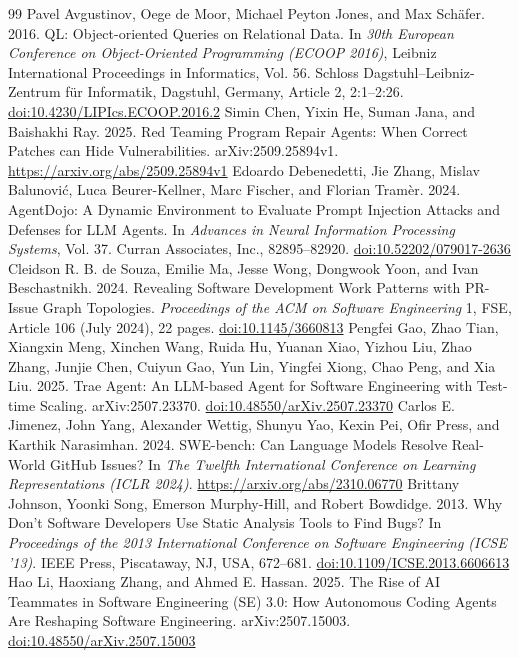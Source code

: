 \documentclass[acmsmall,screen,nonacm]{acmart}
\providecommand{\doi}[1]{\href{https://doi.org/#1}{doi:#1}}
\begin{document}
\clearpage
\raggedbottom
\begingroup
\begin{thebibliography}{99}
\fontsize{8}{9}\selectfont
\setlength{\itemsep}{0pt}
\setlength{\parsep}{0pt}
\setlength{\parskip}{0pt}
 Pavel Avgustinov, Oege de Moor, Michael Peyton Jones, and Max Sch\"afer. 2016. QL: Object-oriented Queries on Relational Data. In \emph{30th European Conference on Object-Oriented Programming (ECOOP 2016)}, Leibniz International Proceedings in Informatics, Vol. 56. Schloss Dagstuhl--Leibniz-Zentrum f\"ur Informatik, Dagstuhl, Germany, Article 2, 2:1--2:26. \doi{10.4230/LIPIcs.ECOOP.2016.2}
 Simin Chen, Yixin He, Suman Jana, and Baishakhi Ray. 2025. Red Teaming Program Repair Agents: When Correct Patches can Hide Vulnerabilities. arXiv:2509.25894v1. \url{https://arxiv.org/abs/2509.25894v1}
 Edoardo Debenedetti, Jie Zhang, Mislav Balunovi\'c, Luca Beurer-Kellner, Marc Fischer, and Florian Tram\`er. 2024. AgentDojo: A Dynamic Environment to Evaluate Prompt Injection Attacks and Defenses for LLM Agents. In \emph{Advances in Neural Information Processing Systems}, Vol. 37. Curran Associates, Inc., 82895--82920. \doi{10.52202/079017-2636}
 Cleidson R. B. de Souza, Emilie Ma, Jesse Wong, Dongwook Yoon, and Ivan Beschastnikh. 2024. Revealing Software Development Work Patterns with PR-Issue Graph Topologies. \emph{Proceedings of the ACM on Software Engineering} 1, FSE, Article 106 (July 2024), 22 pages. \doi{10.1145/3660813}
 Pengfei Gao, Zhao Tian, Xiangxin Meng, Xinchen Wang, Ruida Hu, Yuanan Xiao, Yizhou Liu, Zhao Zhang, Junjie Chen, Cuiyun Gao, Yun Lin, Yingfei Xiong, Chao Peng, and Xia Liu. 2025. Trae Agent: An LLM-based Agent for Software Engineering with Test-time Scaling. arXiv:2507.23370. \doi{10.48550/arXiv.2507.23370}
 Carlos E. Jimenez, John Yang, Alexander Wettig, Shunyu Yao, Kexin Pei, Ofir Press, and Karthik Narasimhan. 2024. SWE-bench: Can Language Models Resolve Real-World GitHub Issues? In \emph{The Twelfth International Conference on Learning Representations (ICLR 2024)}. \url{https://arxiv.org/abs/2310.06770}
 Brittany Johnson, Yoonki Song, Emerson Murphy-Hill, and Robert Bowdidge. 2013. Why Don't Software Developers Use Static Analysis Tools to Find Bugs? In \emph{Proceedings of the 2013 International Conference on Software Engineering (ICSE '13)}. IEEE Press, Piscataway, NJ, USA, 672--681. \doi{10.1109/ICSE.2013.6606613}
 Hao Li, Haoxiang Zhang, and Ahmed E. Hassan. 2025. The Rise of AI Teammates in Software Engineering (SE) 3.0: How Autonomous Coding Agents Are Reshaping Software Engineering. arXiv:2507.15003. \doi{10.48550/arXiv.2507.15003}

\end{thebibliography}
\end{document}
